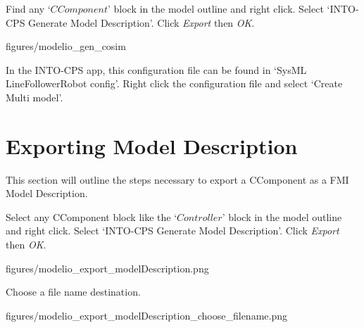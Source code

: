 \documentclass[11pt,a4paper]{../tutorial}
\begin{document}
\begin{instructions}

\item Find any `$CComponent$' block in the model outline and right click. Select `INTO-CPS \menusep Generate Model Description'. Click \emph{Export} then \emph{OK}.

\begin{center}
\begin{annotation}[width=0.7\linewidth]{figures/modelio_gen_cosim}
    \end{annotation}
\end{center}


In the INTO-CPS app, this configuration file can be found in `SysML \menusep LineFollowerRobot \menusep config’. Right click the configuration file and select `Create Multi model’.


\end{instructions}

\section{Exporting Model Description}

This section will outline the steps necessary to export a CComponent as a FMI Model Description.

\begin{instructions}

\item Select any CComponent block like the `$Controller$' block in the model outline and right click. Select `INTO-CPS \menusep Generate Model Description'. Click \emph{Export} then \emph{OK}.

\begin{center}
\begin{annotation}[width=0.7\linewidth]{figures/modelio_export_modelDescription.png}
    \end{annotation}
\end{center}

\item Choose a file name destination.

\begin{center}
\begin{annotation}[width=0.7\linewidth]{figures/modelio_export_modelDescription_choose_filename.png}
    \end{annotation}
\end{center}

\end{instructions}
\end{document}
